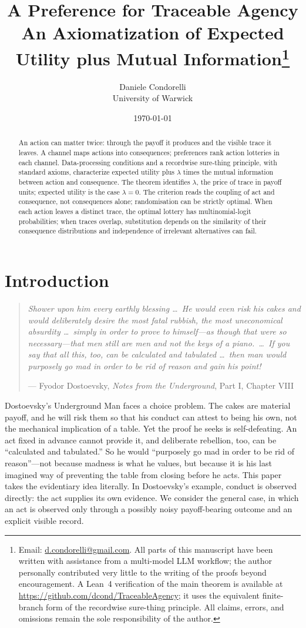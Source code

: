 \documentclass[11pt,a4paper]{article}
\title{A Preference for Traceable Agency\\[0.35em]
\large An Axiomatization of Expected Utility plus Mutual Information\thanks{Email:
\href{mailto:d.condorelli@gmail.com}{d.condorelli@gmail.com}.  All parts of this manuscript have been written with assistance
from a multi-model LLM workflow; the author personally contributed very little to the writing of the proofs
beyond encouragement.  A Lean~4 verification of the main theorem is available at
\url{https://github.com/dcond/TraceableAgency}; it uses the equivalent finite-branch form of the recordwise
sure-thing principle.  All claims, errors, and omissions remain the sole responsibility of the author.}}
\author{Daniele Condorelli\\University of Warwick}
\date{ \today}
\theoremstyle{definition}
\newcommand{\1}{\mathbf 1}
\begin{document}
\maketitle

\begin{abstract}
\noindent
An action can matter twice: through the payoff it produces and the visible trace it leaves.  A channel maps
actions into consequences; preferences rank action lotteries in each channel.  Data-processing conditions and a
recordwise sure-thing principle, with standard axioms, characterize expected utility plus $\lambda$ times the
mutual information between action and consequence.  The theorem identifies $\lambda$, the price of trace in
payoff units; expected utility is the case $\lambda=0$.  The criterion reads the coupling of act and
consequence, not consequences alone; randomisation can be strictly optimal.  When each action leaves a distinct
trace, the optimal lottery has multinomial-logit probabilities; when traces overlap, substitution depends on the
similarity of their consequence distributions and independence of irrelevant alternatives can fail.
\end{abstract}

\clearpage

\section{Introduction}


\begin{quote}
\emph{Shower upon him every earthly blessing \ldots\ He would even risk his cakes and would deliberately desire the
most fatal rubbish, the most uneconomical absurdity \ldots\ simply in order to prove to himself---as though that were
so necessary---that men still are men and not the keys of a piano.\ \ldots\ If you say that all this, too, can be
calculated and tabulated \ldots\ then man would purposely go mad in order to be rid of reason and gain his point!}

\hfill --- Fyodor Dostoevsky, \emph{Notes from the Underground}, Part I, Chapter VIII \cite{Dostoevsky1864}
\end{quote}



Dostoevsky's Underground Man faces a choice problem.  The cakes are material payoff, and he will risk them so
that his conduct can attest to being his own, not the mechanical implication of a table.  Yet the proof he seeks
is self-defeating.  An act fixed in advance cannot provide it, and deliberate rebellion, too, can be
“calculated and tabulated.”  So he would “purposely go mad in order to be rid of reason”---not because
madness is what he values, but because it is his last imagined way of preventing the table from closing before he
acts.  This paper takes the evidentiary idea literally.  In Dostoevsky's
example, conduct is observed directly: the act supplies its own evidence.  We consider the general case, in which
an act is observed only through a possibly noisy payoff-bearing outcome and an explicit visible record.
\end{document}
